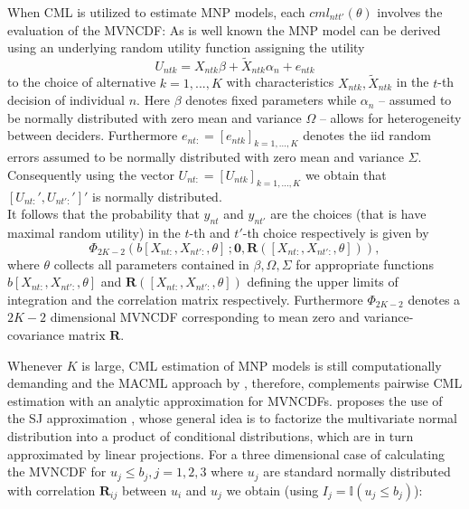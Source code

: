 \documentclass[12pt, a4paper]{article}
\numberwithin{defcounter}{section}
\numberwithin{excounter}{section}
\begin{document}
When \ac{CML}  is utilized to estimate \ac{MNP} models, each $cml_{ntt'}(\theta)$ involves the evaluation of the \ac{MVNCDF}: As is well known the \ac{MNP} model can be derived using an underlying random utility function 
assigning the utility
%
$$
U_{ntk} = X_{ntk}\beta + \tilde X_{ntk}\alpha_n + e_{ntk}
$$
%
to the choice of alternative $k=1,...,K$  with characteristics $X_{ntk}, \tilde X_{ntk}$ in the $t$-th decision of individual $n$. Here $\beta$ denotes fixed parameters while $\alpha_n$ -- assumed to be normally distributed with zero mean and variance $\Omega$ -- allows for heterogeneity between deciders. 
Furthermore $e_{nt:} = [e_{ntk}]_{k=1,...,K}$ denotes the \ac{iid} random errors assumed to be normally distributed with zero mean and variance $\Sigma$. Consequently using the vector $U_{nt:} = [U_{ntk}]_{k=1,...,K}$ we obtain that $[U_{nt:}',U_{nt':}']'$ is normally distributed. 
\\
It follows that the probability that $y_{nt}$ and $y_{nt'}$ are the choices (that is have maximal random utility) in the $t$-th and $t'$-th choice respectively is given by 
\begin{equation} \label{eq:CDF}
\Phi_{2K-2}(b[X_{nt:},X_{nt':},\theta] \, ; \textbf{0}, \textbf{R}([X_{nt:},X_{nt':},\theta])),
\end{equation}
where $\theta$ collects all parameters contained in $\beta, \Omega, \Sigma$ for appropriate functions 
$b[X_{nt:},X_{nt':},\theta]$ and $\textbf{R}([X_{nt:},X_{nt':},\theta])$ defining the upper limits of integration and the correlation matrix respectively. Furthermore $\Phi_{2K-2}$ denotes a $2K-2$ dimensional \ac{MVNCDF} corresponding to mean zero  and variance-covariance matrix $\textbf{R}$.

Whenever $K$ is large, \ac{CML} estimation of \ac{MNP} models is still computationally demanding and the \ac{MACML} approach by \cite{bhat2011}, therefore, complements pairwise \ac{CML} estimation with an analytic approximation for \ac{MVNCDF}s. \cite{bhat2011} proposes the use of the \ac{SJ} approximation \citep{solow1990,joe1995}, whose general idea is to factorize the multivariate normal distribution into a product of conditional distributions, which are in turn approximated by linear projections. For a three dimensional case of calculating the \ac{MVNCDF} for 
$u_j \le b_j, j=1,2,3$ 
where $u_j$ are standard normally distributed 
with correlation $\textbf{R}_{ij}$ between $u_i$ and $u_j$ we obtain (using $I_j = \mathbb{I} (u_j \le b_j)$): 
\end{document}
